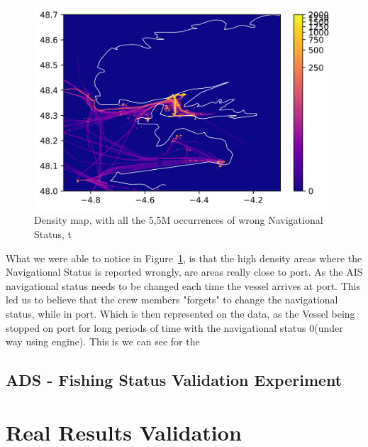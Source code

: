 \begin{figure}[H]
	\centering
	\includegraphics[scale=1]{figures/Ch5/ThesisExpStatusDensityZoom.png}
    \caption{Density map, with all the 5,5M occurrences of wrong Navigational Status, t}
    \label{fig: 5 Exp StatusDensityMap}
\end{figure}

What we were able to notice in Figure~\ref{fig: 5 Exp StatusDensityMap}, is that the high density areas where the Navigational Status is reported wrongly, are areas really close to port. As the AIS navigational status needs to be changed each time the vessel arrives at port. This led us to believe that the crew members "forgets" to change the navigational status, while in port. Which is then represented on the data, as the Vessel being stopped on port for long periods of time with the navigational status 0(under way using engine). This is we can see for the 

\subsection{ADS - Fishing Status Validation Experiment}

\section{Real Results Validation}







